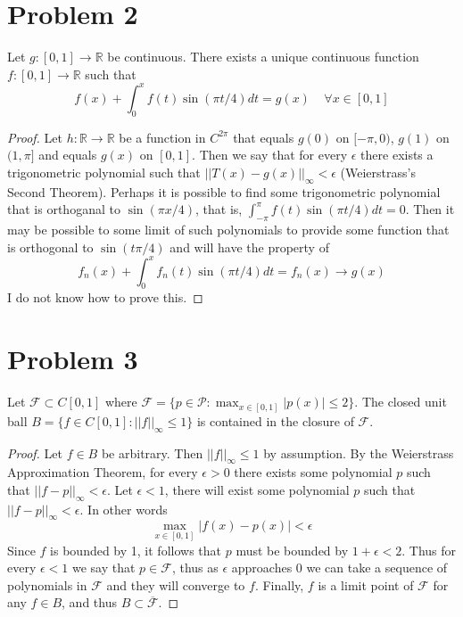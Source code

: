 \documentclass{article}
\theoremstyle{definition}
\begin{document}
\section*{Problem 2}
\begin{mdframed}
    Let $g:[0,1] \rightarrow \mathbb{R}$ be continuous. There exists a unique continuous function $f: [0,1] \rightarrow \mathbb{R}$
    such that 
    \[
        f(x) + \int_0^x f(t) \sin(\pi t / 4) dt = g(x) \ \ \ \ \ \forall x \in [0,1]
    \]
\end{mdframed}
\begin{proof}
    Let $h: \mathbb{R} \rightarrow \mathbb{R}$ be a function in $C^{2\pi}$ that equals $g(0)$ on $[- \pi,0)$, $g(1)$ on $(1,\pi]$
    and equals $g(x)$ on $[0,1]$. Then we say that for every $\epsilon$ there exists a trigonometric polynomial such that $||T(x) - g(x)||_\infty < \epsilon$ (Weierstrass's Second Theorem).
    Perhaps it is possible to find some trigonometric polynomial that is orthoganal to $\sin(\pi x / 4)$, that is, $\int_{-\pi}^\pi f(t) \sin( \pi t / 4) dt = 0$.
    Then it may be possible to some limit of such polynomials to provide some function that is orthogonal to $\sin(t \pi / 4)$ and 
    will have the property of 
    \[
        f_n(x) + \int_0^x f_n(t) \sin( \pi t /4)dt = f_n(x) \rightarrow g(x)
    \]
I do not know how to prove this.
\end{proof}
\section*{Problem 3}
\begin{mdframed}
    Let $\mathcal{F} \subset C[0,1]$ where $\mathcal{F} = \{p \in \mathcal{P} : \max_{x \in [0,1]}|p(x)| \leqslant 2 \}$.
    The closed unit ball $B = \{f \in C[0,1] : ||f||_\infty \leqslant 1\}$ is contained in the closure of $\mathcal{F}$.
\end{mdframed}
\begin{proof}
    Let $f \in B$ be arbitrary. Then $||f||_\infty \leqslant 1$ by assumption. By the Weierstrass Approximation Theorem,
    for every $\epsilon > 0$ there exists some polynomial $p$ such that $||f-p||_\infty < \epsilon$. Let $\epsilon < 1$,
    there will exist some polynomial $p$ such that $||f - p||_\infty < \epsilon$. In other words
    \[
        \max_{x \in [0,1]}|f(x) - p(x)| < \epsilon
    \]
    Since $f$ is bounded by 1, it follows that $p$ must be bounded by $1 + \epsilon < 2$. Thus for every $\epsilon < 1$ 
    we say that $p \in \mathcal{F}$, thus as $\epsilon$ approaches 0 we can take a sequence of polynomials in $\mathcal{F}$
    and they will converge to $f$. Finally, $f$ is a limit point of $\mathcal{F}$ for any $f \in B$, and thus $B \subset \overline{\mathcal{F}}$.
\end{proof}
\end{document}
